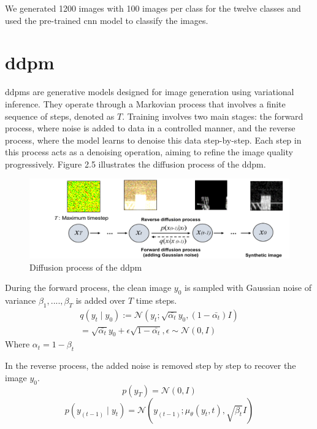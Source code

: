 We generated 1200 images with 100 images per class for the twelve classes and used the pre-trained \gls{cnn} model to classify the images. 

\section{\gls{ddpm}}

\gls{ddpm}s are generative models designed for image generation using variational inference. They operate through a Markovian process that involves a finite sequence of steps, denoted as $T$. Training involves two main stages: the forward process, where noise is added to data in a controlled manner, and the reverse process, where the model learns to denoise this data step-by-step. Each step in this process acts as a denoising operation, aiming to refine the image quality progressively\cite{7}. Figure 2.5 illustrates the diffusion process of the \gls{ddpm}. 

\begin{figure}[h]
\includegraphics[width=\textwidth]{figures/ddpm.png}
\centering
\caption{ Diffusion process of the \gls{ddpm}}
\centering
\end{figure}

During the forward process, the clean image $y_0$ is sampled with Gaussian noise of variance ${\beta_1,....,\beta_T}$ is added over $T$ time steps.
\begin{equation}
\begin{split}
    q(y_t\mid y_0) :=\mathcal{N}(y_t;\sqrt{\bar{\alpha_t}}y_0,(1-\bar{\alpha_t})I)\\
    =\sqrt{\bar{\alpha_t}}y_0+\epsilon\sqrt{1-\bar{\alpha_t}},\epsilon \sim \mathcal{N}(0,I)
    \end{split}
\end{equation}
Where $\alpha_t=1-\beta_t$

In the reverse process, the added noise is removed step by step to recover the image $y_0$.
\begin{equation}
    p(y_T)=\mathcal{N}(0,I)
\end{equation}
\begin{equation}
    p(y_{(t-1)}\mid y_t)=\mathcal{N}(y_{(t-1)};\mu_{\theta}(y_t,t),\sqrt{\beta_t}I)
\end{equation}

